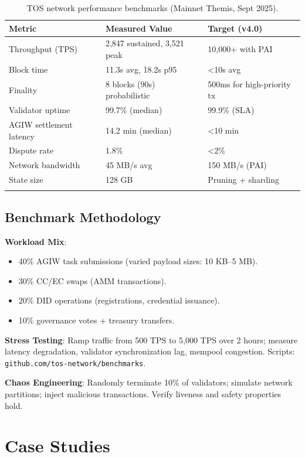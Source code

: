 \documentclass[11pt]{article}
\begin{document}
\begin{longtable}{@{}p{}p{}p{}@{}}
\toprule
\textbf{Metric} & \textbf{Measured Value} & \textbf{Target (v4.0)} \\\midrule
Throughput (TPS) & 2,847 sustained, 3,521 peak & 10,000+ with PAI \\
Block time & 11.3s avg, 18.2s p95 & <10s avg \\
Finality & 8 blocks (90s) probabilistic & 500ms for high-priority tx \\
Validator uptime & 99.7\% (median) & 99.9\% (SLA) \\
AGIW settlement latency & 14.2 min (median) & <10 min \\
Dispute rate & 1.8\% & <2\% \\
Network bandwidth & 45 MB/s avg & 150 MB/s (PAI) \\
State size & 128 GB & Pruning + sharding \\
\bottomrule
\caption{TOS network performance benchmarks (Mainnet Themis, Sept 2025).}
\end{longtable}

\subsection{Benchmark Methodology}

\textbf{Workload Mix}:
\begin{itemize}[noitemsep]
  \item 40\% AGIW task submissions (varied payload sizes: 10 KB--5 MB).
  \item 30\% CC/EC swaps (AMM transactions).
  \item 20\% DID operations (registrations, credential issuance).
  \item 10\% governance votes + treasury transfers.
\end{itemize}

\textbf{Stress Testing}: Ramp traffic from 500 TPS to 5,000 TPS over 2 hours; measure latency degradation, validator synchronization lag, mempool congestion. Scripts: \texttt{github.com/tos-network/benchmarks}.

\textbf{Chaos Engineering}: Randomly terminate 10\% of validators; simulate network partitions; inject malicious transactions. Verify liveness and safety properties hold.

\section{Case Studies}
\label{sec:case-studies}
\end{document}

